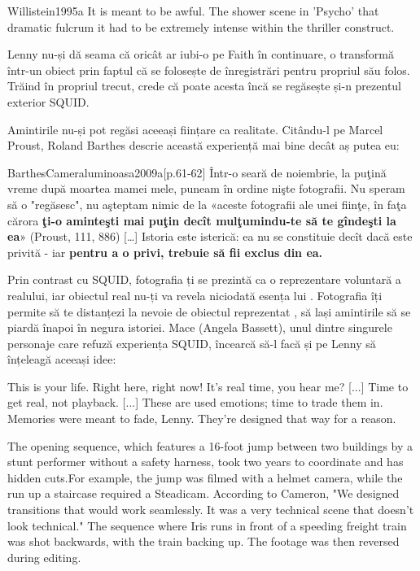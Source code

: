 \documentclass[12pt]{article}
\begin{document}
\begin{displaycquote}{Willistein1995a}
	It is meant to be awful. The shower scene in 'Psycho' \textemdash that dramatic fulcrum \textemdash it had to be extremely intense within the thriller construct.
\end{displaycquote}

Lenny nu-și dă seama că oricât ar iubi-o pe Faith în continuare, o transformă într-un obiect prin faptul că se folosește de înregistrări pentru propriul său folos. Trăind în propriul trecut, crede că poate acesta încă se regăsește și-n prezentul exterior SQUID.\par

Amintirile nu-și pot regăsi aceeași ființare ca realitate. Citându-l pe Marcel Proust, Roland Barthes descrie această experiență mai bine decât aș putea eu:

\begin{displaycquote}{BarthesCameraluminoasa2009a}[p.61-62]
		Într-o seară de noiembrie, la puţină vreme după moartea mamei mele, puneam în ordine nişte fotografii. Nu speram să o "regăsesc", nu aşteptam nimic de la «aceste fotografii ale unei fiinţe, în faţa cărora \textbf{ţi-o aminteşti mai puţin decît mulţumindu-te să te gîndeşti la ea}» (Proust, 111, 886) […] Istoria este isteri­că: ea nu se constituie decît dacă este privită - iar \textbf{pentru a o privi, trebuie să fii exclus din ea.}
\end{displaycquote}

Prin contrast cu SQUID, fotografia ți se prezintă ca o reprezentare voluntară a realului, iar obiectul real nu-ți va revela niciodată esența lui \parencite{BarthesCameraluminoasa2009a}. Fotografia îți permite să te distanțezi la nevoie de obiectul reprezentat \parencite{secSontagPlatosCavea}, să lași amintirile să se piardă înapoi în negura istoriei. Mace (Angela Bassett), unul dintre singurele personaje care refuză experiența SQUID, încearcă să-l facă și pe Lenny să înțeleagă aceeași idee:

\begin{displayquote}
	This is your life. Right here, right now! It’s real time, you hear me? [...] Time to get real, not playback. [...] These are used emotions; time to trade them in. Memories were meant to fade, Lenny. They’re designed that way for a reason.
\end{displayquote}

The opening sequence, which features a 16-foot jump between two buildings by a stunt performer without a safety harness, took two years to coordinate and has hidden cuts.For example, the jump was filmed with a helmet camera, while the run up a staircase required a Steadicam. According to Cameron, "We designed transitions that would work seamlessly. It was a very technical scene that doesn't look technical." The sequence where Iris runs in front of a speeding freight train was shot backwards, with the train backing up. The footage was then reversed during editing.

\printbibliography
\end{document}
